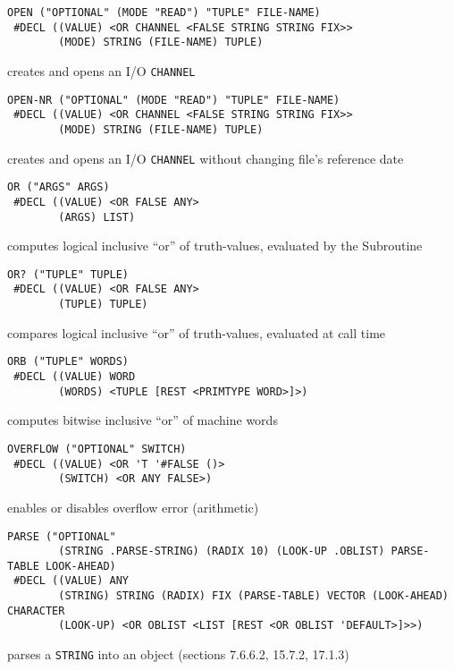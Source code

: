 \documentclass[a4paper,]{article}
\begin{document}
\begin{verbatim}
OPEN ("OPTIONAL" (MODE "READ") "TUPLE" FILE-NAME)
 #DECL ((VALUE) <OR CHANNEL <FALSE STRING STRING FIX>>
        (MODE) STRING (FILE-NAME) TUPLE)
\end{verbatim}

creates and opens an I/O \texttt{CHANNEL}

\begin{verbatim}
OPEN-NR ("OPTIONAL" (MODE "READ") "TUPLE" FILE-NAME)
 #DECL ((VALUE) <OR CHANNEL <FALSE STRING STRING FIX>>
        (MODE) STRING (FILE-NAME) TUPLE)
\end{verbatim}

creates and opens an I/O \texttt{CHANNEL} without changing file's reference date

\begin{verbatim}
OR ("ARGS" ARGS)
 #DECL ((VALUE) <OR FALSE ANY>
        (ARGS) LIST)
\end{verbatim}

computes logical inclusive ``or'' of truth-values, evaluated by the Subroutine

\begin{verbatim}
OR? ("TUPLE" TUPLE)
 #DECL ((VALUE) <OR FALSE ANY>
        (TUPLE) TUPLE)
\end{verbatim}

compares logical inclusive ``or'' of truth-values, evaluated at call time

\begin{verbatim}
ORB ("TUPLE" WORDS)
 #DECL ((VALUE) WORD
        (WORDS) <TUPLE [REST <PRIMTYPE WORD>]>)
\end{verbatim}

computes bitwise inclusive ``or'' of machine words

\begin{verbatim}
OVERFLOW ("OPTIONAL" SWITCH)
 #DECL ((VALUE) <OR 'T '#FALSE ()>
        (SWITCH) <OR ANY FALSE>)
\end{verbatim}

enables or disables overflow error (arithmetic)

\begin{verbatim}
PARSE ("OPTIONAL"
        (STRING .PARSE-STRING) (RADIX 10) (LOOK-UP .OBLIST) PARSE-TABLE LOOK-AHEAD)
 #DECL ((VALUE) ANY
        (STRING) STRING (RADIX) FIX (PARSE-TABLE) VECTOR (LOOK-AHEAD) CHARACTER
        (LOOK-UP) <OR OBLIST <LIST [REST <OR OBLIST 'DEFAULT>]>>)
\end{verbatim}

parses a \texttt{STRING} into an object (sections 7.6.6.2, 15.7.2, 17.1.3)
\end{document}

